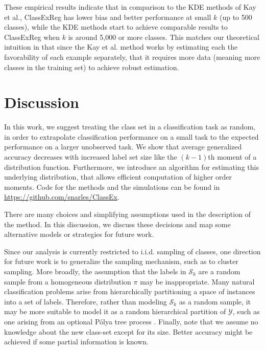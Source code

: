 \documentclass[twoside,11pt]{article}
\begin{document}
These empirical results indicate that in comparison to the KDE methods of Kay et al., ClassExReg has lower bias and better performance at small $k$ (up to 500 classes), while the KDE methods start to achieve comparable results to ClassExReg when $k$ is around 5,000 or more classes.  This matches our theoretical intuition in that since the Kay et al. method works by estimating each the favorability of each example separately, that it requires more data (meaning more classes in the training set) to achieve robust estimation.  %

\section{Discussion}
\label{sec:discussion}
In this work, we suggest treating the class set in a classification
task as random, in order to extrapolate classification performance on
a small task to the expected performance on a larger unobserved task.
We show that average generalized accuracy decreases with increased
label set size like the $(k-1)$th moment of a distribution function.
Furthermore, we introduce an algorithm for estimating this underlying
distribution, that allows efficient computation of higher order
moments. Code for the methods and the simulations can be found in \url{https://github.com/snarles/ClassEx}.

There are many choices and simplifying assumptions used in
the description of the method.  In this discussion, we discuss these
decisions and map some alternative models or strategies for future
work.




Since our analysis is currently restricted to i.i.d. sampling of classes, 
one direction for future work is to generalize the sampling mechanism,
such as to cluster sampling.  More broadly, the assumption that the labels in $\mathcal{S}_k$ are a
random sample from a homogeneous distribution $\pi$ may be inappropriate.  Many
natural classification problems arise from hierarchically partitioning
a space of instances into a set of labels.  Therefore, rather than
modeling $\mathcal{S}_k$ as a random sample, it may be more suitable
to model it as a random hierarchical partition of $\mathcal{Y}$, such as one arising from an optional P{\'o}lya tree process
\citep{wong2010optional}.
Finally, note that we assume no knowledge about the new class-set
except for its size. Better accuracy might be achieved if some partial information 
is known.
\end{document}
